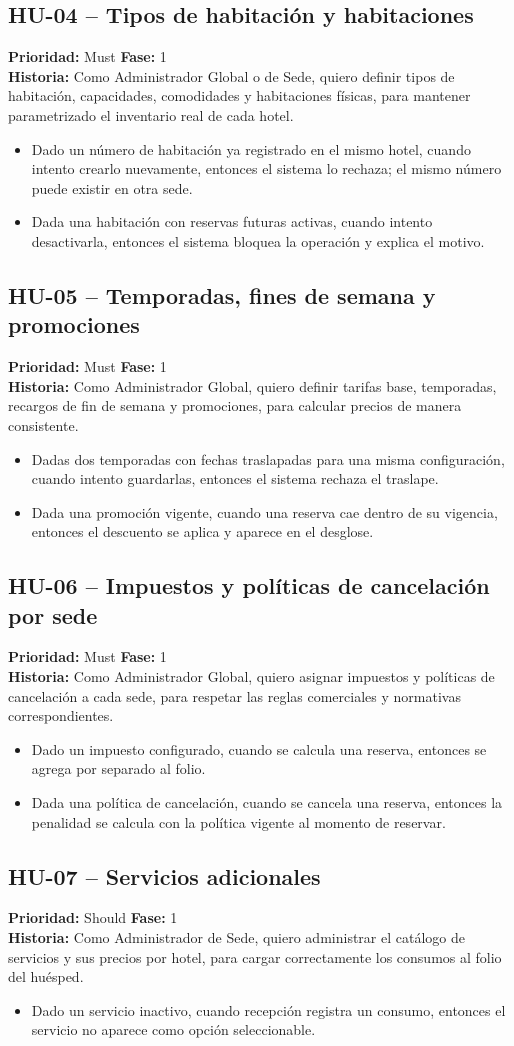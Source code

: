 \documentclass[12pt,a4paper]{article}
\newcommand{\HU}[5]{%
  \subsection*{#1 -- #2}
  \noindent\textbf{Prioridad:} #3 \hfill \textbf{Fase:} #4\\
  \noindent\textbf{Historia:} #5
  \vspace{2mm}
}
\begin{document}
\HU{HU-04}{Tipos de habitación y habitaciones}{Must}{1}{Como Administrador Global o de Sede, quiero definir tipos de habitación, capacidades, comodidades y habitaciones físicas, para mantener parametrizado el inventario real de cada hotel.}
\begin{itemize}
  \item Dado un número de habitación ya registrado en el mismo hotel, cuando intento crearlo nuevamente, entonces el sistema lo rechaza; el mismo número puede existir en otra sede.
  \item Dada una habitación con reservas futuras activas, cuando intento desactivarla, entonces el sistema bloquea la operación y explica el motivo.
\end{itemize}

\HU{HU-05}{Temporadas, fines de semana y promociones}{Must}{1}{Como Administrador Global, quiero definir tarifas base, temporadas, recargos de fin de semana y promociones, para calcular precios de manera consistente.}
\begin{itemize}
  \item Dadas dos temporadas con fechas traslapadas para una misma configuración, cuando intento guardarlas, entonces el sistema rechaza el traslape.
  \item Dada una promoción vigente, cuando una reserva cae dentro de su vigencia, entonces el descuento se aplica y aparece en el desglose.
\end{itemize}

\HU{HU-06}{Impuestos y políticas de cancelación por sede}{Must}{1}{Como Administrador Global, quiero asignar impuestos y políticas de cancelación a cada sede, para respetar las reglas comerciales y normativas correspondientes.}
\begin{itemize}
  \item Dado un impuesto configurado, cuando se calcula una reserva, entonces se agrega por separado al folio.
  \item Dada una política de cancelación, cuando se cancela una reserva, entonces la penalidad se calcula con la política vigente al momento de reservar.
\end{itemize}

\HU{HU-07}{Servicios adicionales}{Should}{1}{Como Administrador de Sede, quiero administrar el catálogo de servicios y sus precios por hotel, para cargar correctamente los consumos al folio del huésped.}
\begin{itemize}
  \item Dado un servicio inactivo, cuando recepción registra un consumo, entonces el servicio no aparece como opción seleccionable.
\end{itemize}
\end{document}
